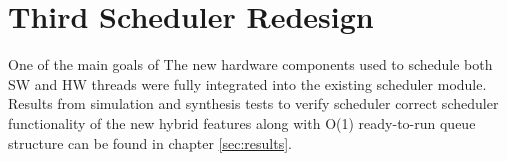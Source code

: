 \section{Third Scheduler Redesign} \label{sec:build3} One of the main goals of
The new hardware components used to schedule both SW and HW threads were fully
integrated into the existing scheduler module.  Results from simulation and
synthesis tests to verify scheduler correct scheduler functionality of the new
hybrid features along with O(1) ready-to-run queue structure can be found in
chapter \ref{sec:results}.

